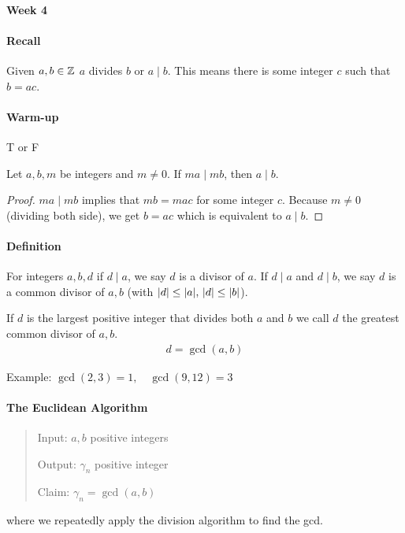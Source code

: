 \documentclass[../main.tex]{subfiles}
\begin{document}
\newpage
{}
\paragraph{Week 4}

\paragraph{Recall} Given $a, b \in \mathbb{Z}$ $a$ divides $b$ or $a \mid b$. This means there is some
integer $c$ such that $b = ac$.

\paragraph{Warm-up} \textcolor{draculagreen}{T} or F

Let $a,b,m$ be integers and $m \neq 0$. If $ma \mid mb$, then $a \mid b$.

\begin{proof}
    $ma \mid mb$ implies that $mb = mac$ for some integer $c$. Because $m \neq 0$ (dividing both
    side), we get $b = ac$ which is equivalent to $a \mid b$.
\end{proof}

\paragraph{Definition}

For integers $a, b, d$ if $d \mid a$, we say $d$ is a divisor of $a$. If $d \mid a$ and $d \mid b$,
we say $d$ is a common divisor of $a, b$ (with $\abs{d} \leq \abs{a},\, \abs{d} \leq \abs{b}$).

If $d$ is the largest positive integer that divides both $a$ and $b$ we call $d$ the greatest common
divisor of $a, b$. 
\begin{align*}
    d = \gcd(a, b)
\end{align*}

Example: \(\gcd(2,3) = 1, \quad \gcd(9,12) = 3\)

\paragraph{The Euclidean Algorithm}

\begin{quotation}
    Input: $a,b$ positive integers

    Output: $\gamma_n$ positive integer

    Claim: $\gamma_n = \gcd(a,b)$
\end{quotation}
where we repeatedly apply the division algorithm to find the gcd.
\end{document}
